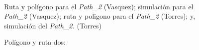 \documentclass[]{report}
\begin{document}
\begin{figure}%
	\centering
	\hspace{8pt}%
	 \\
	\hspace{8pt}%
	\caption[A set of four subfigures.]{Polígono y ruta dos:}
	 Ruta y polígono para el \textit{Path\_2} (Vasquez);
	 simulación para el \textit{Path\_2} (Vasquez);
	 ruta y poligono para el \textit{Path\_2} (Torres); y,
	 simulación del \textit{Path\_2.} (Torres)%
	\label{path_2}%
\end{figure}
\end{document}
